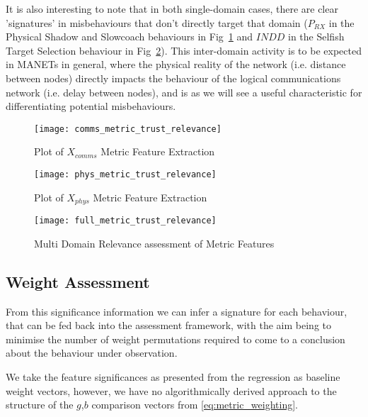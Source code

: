 It is also interesting to note that in both single-domain cases, there are clear 'signatures' in misbehaviours that don't directly target that domain ($P_{RX}$ in the Physical Shadow and Slowcoach behaviours in Fig~\ref{fig:comms_feature_extraction} and $INDD$ in the Selfish Target Selection behaviour in Fig~\ref{fig:phys_feature_extraction}).
This inter-domain activity is to be expected in MANETs in general, where the physical reality of the network (i.e. distance between nodes) directly impacts the behaviour of the logical communications network (i.e. delay between nodes), and is as we will see a useful characteristic for differentiating potential misbehaviours.



\begin{figure}[h!]
	\centering
  \texttt{[image: comms\_metric\_trust\_relevance]}
	\caption{Plot of $X_{comms}$ Metric Feature Extraction}
	\label{fig:comms_feature_extraction}
\end{figure}

\begin{figure}[h!]
	\centering
  \texttt{[image: phys\_metric\_trust\_relevance]}
	\caption{Plot of $X_{phys}$ Metric Feature Extraction}
	\label{fig:phys_feature_extraction}
\end{figure}

\begin{figure}[h!]
  \centering
  \texttt{[image: full\_metric\_trust\_relevance]}
  \caption{Multi Domain Relevance assessment of Metric Features}
  \label{fig:multi_feature_extraction}
\end{figure}

%

\subsection{Weight Assessment}

From this significance information we can infer a signature for each behaviour, that can be fed back into the assessment framework, with the aim being to minimise the number of weight permutations required to come to a conclusion about the behaviour under observation. 

We take the feature significances as presented from the regression as baseline weight vectors, however, we have no algorithmically derived approach to the structure of the $g$,$b$ comparison vectors from \eqref{eq:metric_weighting}.

